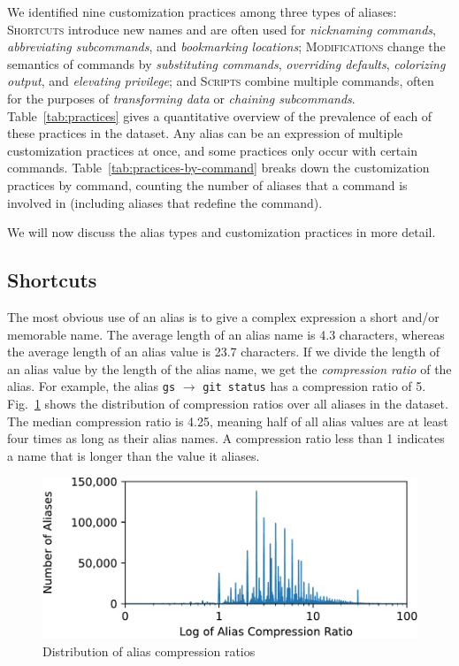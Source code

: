 \documentclass[smallextended,natbib]{svjour3}
\newcommand{\alias}[2]{{\texttt{#1} $\rightarrow$ \texttt{#2}}}
\begin{document}
We identified nine customization practices among three types of aliases:
\textsc{Shortcuts} introduce new names and are often used for \emph{nicknaming commands}, \emph{abbreviating subcommands}, and \emph{bookmarking locations};
\textsc{Modifications} change the semantics of commands by \emph{substituting commands}, \emph{overriding defaults}, \emph{colorizing output}, and \emph{elevating privilege};
and \textsc{Scripts} combine multiple commands, often for the purposes of \emph{transforming data} or \emph{chaining subcommands}.
Table~\ref{tab:practices} gives a quantitative overview of the prevalence of each of these practices in the dataset.
Any alias can be an expression of multiple customization practices at once, and some practices only occur with certain commands.
Table~\ref{tab:practices-by-command} breaks down the customization practices by command, counting the number of aliases that a command is involved in (including aliases that redefine the command).

We will now discuss the alias types and customization practices in more detail.



\subsection{Shortcuts}

The most obvious use of an alias is to give a complex expression a short and/or memorable name.
The average length of an alias name is 4.3 characters, whereas the average length of an alias value is 23.7 characters.
If we divide the length of an alias value by the length of the alias name, we get the \emph{compression ratio} of the alias.
For example, the alias \alias{gs}{git status} has a compression ratio of 5.
Fig.~\ref{fig:compression} shows the distribution of compression ratios over all aliases in the dataset.
The median compression ratio is 4.25, meaning half of all alias values are at least four times as long as their alias names.
A compression ratio less than 1 indicates a name that is longer than the value it aliases.

\begin{figure}
    \centering
    \includegraphics[width=0.75\columnwidth]{fig-compression.pdf}
    \caption{Distribution of alias compression ratios}
    \label{fig:compression}
\end{figure}
\end{document}
